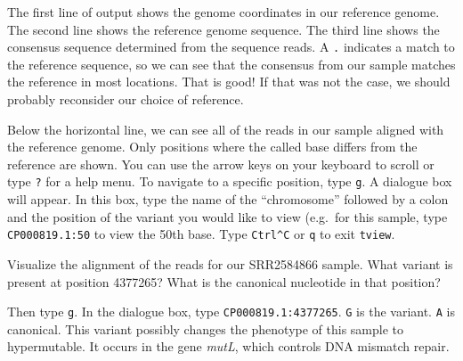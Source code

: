 \documentclass[
  letterpaper,
  DIV=11,
  numbers=noendperiod]{scrreprt}
\newenvironment{Shaded}{\begin{snugshade}}{\end{snugshade}}
\newcommand{\ExtensionTok}[1]{\textcolor[rgb]{0.00,0.23,0.31}{#1}}
\newcommand{\NormalTok}[1]{\textcolor[rgb]{0.00,0.23,0.31}{#1}}
\begin{document}
The first line of output shows the genome coordinates in our reference
genome. The second line shows the reference genome sequence. The third
line shows the consensus sequence determined from the sequence reads. A
\texttt{.} indicates a match to the reference sequence, so we can see
that the consensus from our sample matches the reference in most
locations. That is good! If that was not the case, we should probably
reconsider our choice of reference.

Below the horizontal line, we can see all of the reads in our sample
aligned with the reference genome. Only positions where the called base
differs from the reference are shown. You can use the arrow keys on your
keyboard to scroll or type \texttt{?} for a help menu. To navigate to a
specific position, type \texttt{g}. A dialogue box will appear. In this
box, type the name of the ``chromosome'' followed by a colon and the
position of the variant you would like to view (e.g.~for this sample,
type \texttt{CP000819.1:50} to view the 50th base. Type
\texttt{Ctrl\^{}C} or \texttt{q} to exit \texttt{tview}.

\begin{tcolorbox}[enhanced jigsaw, toptitle=1mm, breakable, bottomrule=.15mm, colback=white, toprule=.15mm, opacityback=0, bottomtitle=1mm, coltitle=black, opacitybacktitle=0.6, rightrule=.15mm, colframe=quarto-callout-caution-color-frame, titlerule=0mm, colbacktitle=quarto-callout-caution-color!10!white, title={Exercise}, left=2mm, leftrule=.75mm, arc=.35mm]

Visualize the alignment of the reads for our SRR2584866 sample. What
variant is present at position 4377265? What is the canonical nucleotide
in that position?

\end{tcolorbox}

\begin{tcolorbox}[enhanced jigsaw, toptitle=1mm, breakable, bottomrule=.15mm, colback=white, toprule=.15mm, opacityback=0, bottomtitle=1mm, coltitle=black, opacitybacktitle=0.6, rightrule=.15mm, colframe=quarto-callout-caution-color-frame, titlerule=0mm, colbacktitle=quarto-callout-caution-color!10!white, title={Solution}, left=2mm, leftrule=.75mm, arc=.35mm]

\begin{Shaded}
\end{Shaded}

Then type \texttt{g}. In the dialogue box, type
\texttt{CP000819.1:4377265}. \texttt{G} is the variant. \texttt{A} is
canonical. This variant possibly changes the phenotype of this sample to
hypermutable. It occurs in the gene \emph{mutL}, which controls DNA
mismatch repair.

\end{tcolorbox}
\end{document}
